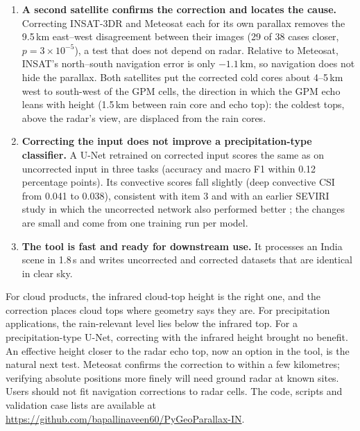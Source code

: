 \begin{enumerate}
\begin{itemize}
    \item Brightness-temperature heights of the coldest tops lie at the tropopause, about 3\,km above the GPM echo tops, with either the standard atmosphere or ERA5.
    \item In the 14 cases of 2022--2024, ERA5 profiles change the offsets by less than 0.5\,km and terrain by less than 0.1\,km; terrain moves clear-sky ground in the Himalaya by up to 6\,km.
  \end{itemize}
  \item \textbf{A second satellite confirms the correction and locates the cause.} Correcting INSAT-3DR and Meteosat each for its own parallax removes the 9.5\,km east--west disagreement between their images (29 of 38 cases closer, $p=3\times10^{-5}$), a test that does not depend on radar. Relative to Meteosat, INSAT's north--south navigation error is only $-1.1$\,km, so navigation does not hide the parallax. Both satellites put the corrected cold cores about 4--5\,km west to south-west of the GPM cells, the direction in which the GPM echo leans with height (1.5\,km between rain core and echo top): the coldest tops, above the radar's view, are displaced from the rain cores.
  \item \textbf{Correcting the input does not improve a precipitation-type classifier.} A U-Net retrained on corrected input scores the same as on uncorrected input in three tasks (accuracy and macro F1 within 0.12 percentage points). Its convective scores fall slightly (deep convective CSI from 0.041 to 0.038), consistent with item 3 and with an earlier SEVIRI study in which the uncorrected network also performed better \citep{dadderio2023}; the changes are small and come from one training run per model.
  \item \textbf{The tool is fast and ready for downstream use.} It processes an India scene in 1.8\,s and writes uncorrected and corrected datasets that are identical in clear sky.
\end{enumerate}

For cloud products, the infrared cloud-top height is the right one, and the correction places cloud tops where geometry says they are. For precipitation applications, the rain-relevant level lies below the infrared top. For a precipitation-type U-Net, correcting with the infrared height brought no benefit. An effective height closer to the radar echo top, now an option in the tool, is the natural next test. Meteosat confirms the correction to within a few kilometres; verifying absolute positions more finely will need ground radar at known sites. Users should not fit navigation corrections to radar cells. The code, scripts and validation case lists are available at \url{https://github.com/bapallinaveen60/PyGeoParallax-IN}.
